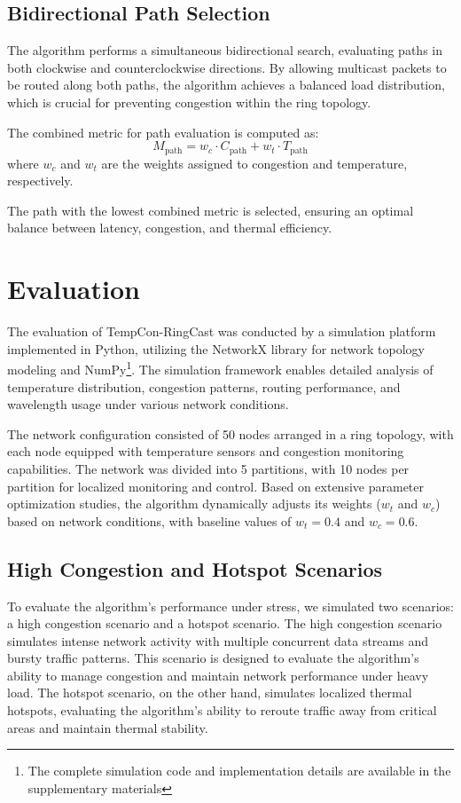 \documentclass[conference]{IEEEtran}
\begin{document}
\subsection{Bidirectional Path Selection}
The algorithm performs a simultaneous bidirectional search, evaluating paths in both clockwise and counterclockwise directions. By allowing multicast packets to be routed along both paths, the algorithm achieves a balanced load distribution, which is crucial for preventing congestion within the ring topology.

The combined metric for path evaluation is computed as:
\begin{equation}
M_{\text{path}} = w_c \cdot C_{\text{path}} + w_t \cdot T_{\text{path}}
\end{equation}
where $w_c$ and $w_t$ are the weights assigned to congestion and temperature, respectively.

The path with the lowest combined metric is selected, ensuring an optimal balance between latency, congestion, and thermal efficiency.

\section{Evaluation}
The evaluation of TempCon-RingCast was conducted by a simulation platform implemented in Python, utilizing the NetworkX library for network topology modeling and NumPy\footnote{The complete simulation code and implementation details are available in the supplementary materials}. The simulation framework enables detailed analysis of temperature distribution, congestion patterns, routing performance, and wavelength usage under various network conditions.

The network configuration consisted of 50 nodes arranged in a ring topology, with each node equipped with temperature sensors and congestion monitoring capabilities. The network was divided into 5 partitions, with 10 nodes per partition for localized monitoring and control. Based on extensive parameter optimization studies, the algorithm dynamically adjusts its weights ($w_t$ and $w_c$) based on network conditions, with baseline values of $w_t = 0.4$ and $w_c = 0.6$.

\subsection{High Congestion and Hotspot Scenarios}
To evaluate the algorithm's performance under stress, we simulated two scenarios: a high congestion scenario and a hotspot scenario. The high congestion scenario simulates intense network activity with multiple concurrent data streams and bursty traffic patterns. This scenario is designed to evaluate the algorithm's ability to manage congestion and maintain network performance under heavy load. The hotspot scenario, on the other hand, simulates localized thermal hotspots, evaluating the algorithm's ability to reroute traffic away from critical areas and maintain thermal stability.
\end{document}
